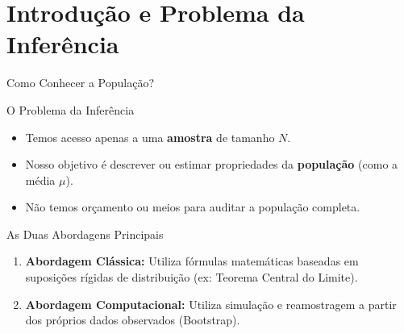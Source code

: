 \section{Introdução e Problema da Inferência}

\begin{frame}{Como Conhecer a População?}
    \begin{block}{O Problema da Inferência}
        \begin{itemize}
            \item Temos acesso apenas a uma \textbf{amostra} de tamanho $N$.
            \item Nosso objetivo é descrever ou estimar propriedades da \textbf{população} (como a média $\mu$).
            \item Não temos orçamento ou meios para auditar a população completa.
        \end{itemize}
    \end{block}
    
    \begin{alertblock}{As Duas Abordagens Principais}
        \begin{enumerate}
            \item \textbf{Abordagem Clássica:} Utiliza fórmulas matemáticas baseadas em suposições rígidas de distribuição (ex: Teorema Central do Limite).
            \item \textbf{Abordagem Computacional:} Utiliza simulação e reamostragem a partir dos próprios dados observados (Bootstrap).
        \end{enumerate}
    \end{alertblock}
\end{frame}

